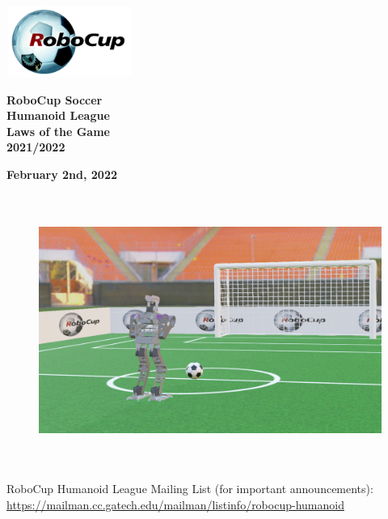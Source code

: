\documentclass[a4paper]{article}
\title{}
\author{\rulesauthor}
\date{2022-02-02}
\begin{document}
    \sffamily

    \begin{center}
        \includegraphics[width=1.6264in,height=0.9055in]{img/robocup_logo.jpg}

        {\Huge \bfseries
        RoboCup Soccer
        \\
        Humanoid League
        \\
        Laws of the Game
        \\ \vspace{0.5cm}
        2021/2022}

        \bigskip

        {\bfseries February 2nd, 2022}
    \end{center}

    \begin{figure}[!h]
        \centering
        \includegraphics[height=3.5in]{img/title_virtual.png}
        \captionsetup{labelformat=empty}
    \end{figure}


    \bigskip
    RoboCup Humanoid League Mailing List (for important announcements):\\
    \url{https://mailman.cc.gatech.edu/mailman/listinfo/robocup-humanoid}
\end{document}
